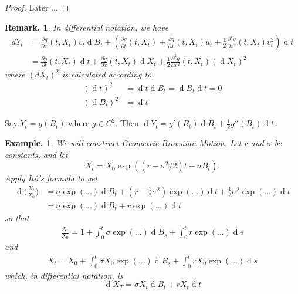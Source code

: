 \documentclass[11pt, a4paper]{memoir}
\theoremstyle{change}
\theoremstyle{plain}
\theoremstyle{nonumberplain}
\newtheorem{example}{Example.}
\newtheorem{remark}{Remark.}
\newtheorem{proof}{Proof}
\renewcommand{\d}[1]{\ensuremath{\operatorname{d}\!{#1}}}
\newcommand{\prt}[2]{\ensuremath{\frac{\partial #1}{\partial #2}}}
\numberwithin{equation}{section}
\begin{document}
\begin{proof}
    Later ...
\end{proof}
\begin{remark}
    In differential notation, we have
    \begin{align*}
        dY_t&=\prt{g}{x}(t,X_t)v_t\d{B_t}+\left(\prt{g}{t}(t,X_t)+\prt{g}{x}(t,X_t)u_t+\frac{1}{2}\frac{\partial^2 g}{\partial x^2}(t,X_t)v_t^2\right)\d{t}\\
            &= \prt{g}{t}(t,X_t)\d{t} + \prt{g}{x}(t,X_t)\d{X_t}+\frac{1}{2}\frac{\partial^2 g}{\partial x^2}(t,X_t)(\d{X_t})^2
    \end{align*}
    where $(dX_t)^2$ is calculated according to
    \begin{align*}
        (\d{t})^2&=\d{t}\d{B_t}=\d{B_t}\d{t}=0\\
        (\d{B_t})^2&=\d{t}
    \end{align*}
\end{remark}
Say $Y_t=g(B_t)$ where $g\in C^2$.
Then $\d{Y_t}=g'(B_t)\d{B_t}+\frac{1}{2}g''(B_t)\d{t}$.
\begin{example}
    We will construct Geometric Brownian Motion.
    Let $r$ and $\sigma$ be constants, and let
    \begin{equation*}
        X_t=X_0\exp((r-\sigma^2/2)t+\sigma B_t).
    \end{equation*}
    Apply Itô's formula to get
    \begin{align*}
        \d{\bigl(\frac{X_t}{X_0}\bigr)} &= \sigma\exp(...)\d{B_t}+\left(r-\frac{1}{2}\sigma^2\right)\exp( ... )\d{t} + \frac{1}{2}\sigma^2\exp( ... )\d{t}\\
                                        &= \sigma\exp( ... )\d{B_t}+r\exp( ... )\d{t}
    \end{align*}
    so that
    \begin{align*}
        \frac{X_t}{X_0}=1+\int_0^t\sigma\exp( ...)\d{B_s} + \int_0^t r\exp( ... )\d{s}
    \end{align*}
    and
    \begin{align*}
        X_t=X_0+\int_0^t\sigma X_0\exp( ...)\d{B_s} + \int_0^t r X_0\exp( ... )\d{s}
    \end{align*}
    which, in differential notation, is
    \begin{equation*}
        \d{X_T}=\sigma X_t\d{B_t}+rX_t\d{t}
    \end{equation*}
\end{example}
\end{document}
